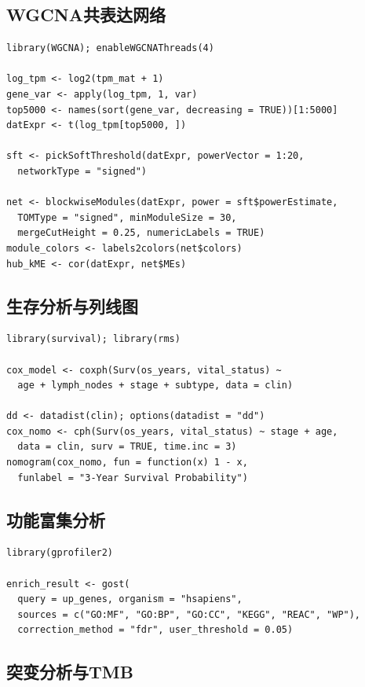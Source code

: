 \documentclass[12pt,a4paper]{ctexart}
\begin{document}
\subsection{WGCNA共表达网络}

\begin{lstlisting}[caption={WGCNA共表达网络构建}]
library(WGCNA); enableWGCNAThreads(4)

log_tpm <- log2(tpm_mat + 1)
gene_var <- apply(log_tpm, 1, var)
top5000 <- names(sort(gene_var, decreasing = TRUE))[1:5000]
datExpr <- t(log_tpm[top5000, ])

sft <- pickSoftThreshold(datExpr, powerVector = 1:20,
  networkType = "signed")

net <- blockwiseModules(datExpr, power = sft$powerEstimate,
  TOMType = "signed", minModuleSize = 30,
  mergeCutHeight = 0.25, numericLabels = TRUE)
module_colors <- labels2colors(net$colors)
hub_kME <- cor(datExpr, net$MEs)
\end{lstlisting}

\subsection{生存分析与列线图}

\begin{lstlisting}[caption={Cox回归与预后列线图}]
library(survival); library(rms)

cox_model <- coxph(Surv(os_years, vital_status) ~
  age + lymph_nodes + stage + subtype, data = clin)

dd <- datadist(clin); options(datadist = "dd")
cox_nomo <- cph(Surv(os_years, vital_status) ~ stage + age,
  data = clin, surv = TRUE, time.inc = 3)
nomogram(cox_nomo, fun = function(x) 1 - x,
  funlabel = "3-Year Survival Probability")
\end{lstlisting}

\subsection{功能富集分析}

\begin{lstlisting}[caption={g:Profiler功能富集}]
library(gprofiler2)

enrich_result <- gost(
  query = up_genes, organism = "hsapiens",
  sources = c("GO:MF", "GO:BP", "GO:CC", "KEGG", "REAC", "WP"),
  correction_method = "fdr", user_threshold = 0.05)
\end{lstlisting}

\subsection{突变分析与TMB}
\end{document}
